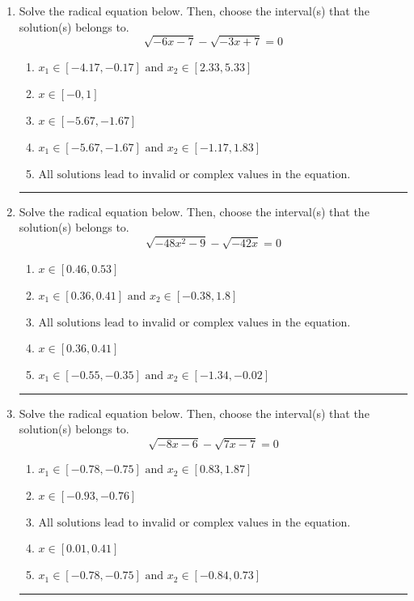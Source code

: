 \documentclass[14pt]{extbook}
\newcommand{\litem}[1]{\item#1\hspace*{-1cm}\rule{\textwidth}{0.4pt}}
\begin{document}
\begin{enumerate}
{\begin{enumerate}[label=\Alph*.]
\end{enumerate} }
\litem{
Solve the radical equation below. Then, choose the interval(s) that the solution(s) belongs to.\[ \sqrt{-6 x - 7} - \sqrt{-3 x + 7} = 0 \]\begin{enumerate}[label=\Alph*.]
\item \( x_1 \in [-4.17, -0.17] \text{ and } x_2 \in [2.33,5.33] \)
\item \( x \in [-0,1] \)
\item \( x \in [-5.67,-1.67] \)
\item \( x_1 \in [-5.67, -1.67] \text{ and } x_2 \in [-1.17,1.83] \)
\item \( \text{All solutions lead to invalid or complex values in the equation.} \)

\end{enumerate} }
\litem{
Solve the radical equation below. Then, choose the interval(s) that the solution(s) belongs to.\[ \sqrt{-48 x^2 - 9} - \sqrt{-42 x} = 0 \]\begin{enumerate}[label=\Alph*.]
\item \( x \in [0.46,0.53] \)
\item \( x_1 \in [0.36, 0.41] \text{ and } x_2 \in [-0.38,1.8] \)
\item \( \text{All solutions lead to invalid or complex values in the equation.} \)
\item \( x \in [0.36,0.41] \)
\item \( x_1 \in [-0.55, -0.35] \text{ and } x_2 \in [-1.34,-0.02] \)

\end{enumerate} }
\litem{
Solve the radical equation below. Then, choose the interval(s) that the solution(s) belongs to.\[ \sqrt{-8 x - 6} - \sqrt{7 x - 7} = 0 \]\begin{enumerate}[label=\Alph*.]
\item \( x_1 \in [-0.78, -0.75] \text{ and } x_2 \in [0.83,1.87] \)
\item \( x \in [-0.93,-0.76] \)
\item \( \text{All solutions lead to invalid or complex values in the equation.} \)
\item \( x \in [0.01,0.41] \)
\item \( x_1 \in [-0.78, -0.75] \text{ and } x_2 \in [-0.84,0.73] \)


\end{enumerate}}
\end{enumerate}
\end{document}

